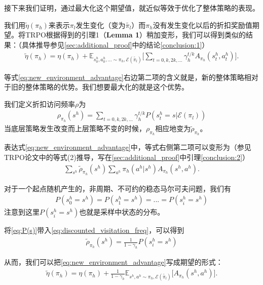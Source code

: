 接下来我们证明，通过最大化这个期望值，就近似等效于优化了整体策略的表现。

我们用$\tilde{\eta}(\pi_h)$来表示$\pi_l$发生变化（变为$\tilde{\pi_l}$）而$\pi_h$没有发生变化以后的折扣奖励值期望。将TRPO根据\cite{TRPO_pre}得到的引理1（\textbf{Lemma 1}）稍加变形，我们可以得到类似的结果：（具体推导参见\ref{sec:additional_proof}中的结论\ref{conclusion:1}）
\begin{align}
  \tilde{\eta}(\pi_h) = \eta(\pi_h) + \mathbb{E}_{s_0^h, a_0^h, ... \sim \pi_h, \mathcal{E}(\tilde{\pi_l})}\Bigg[\sum_{t=0,k,2k,...} \gamma_h^{t/k} A_{\pi_h}(s_t^h, a_t^h)\Bigg].
  \label{eq:new_environment_advantage}
\end{align}

等式\eqref{eq:new_environment_advantage}右边第二项的含义就是，新的整体策略相对于旧的整体策略的优势。我们想要最大化的就是这个优势。

我们定义折扣访问频率$\rho$为
\begin{align}
  \rho_{\pi_h}(s^h) = \sum_{t = 0, k, 2k, ...}\gamma_h^{t/k}P(s_t^h = s|\mathcal{E}(\pi_l))
  \label{eq:discounted_visitation_freq}
\end{align}
当底层策略发生改变而上层策略不变的时候，$\rho_{\pi_h}$相应地变为$\tilde{\rho}_{\pi_h}$。

表达式\eqref{eq:new_environment_advantage}中，等式右侧第二项可以变形为（参见TRPO论文中的等式(2)推导，写在\ref{sec:additional_proof}中引理\ref{conclusion:2}）
\begin{align}
  \sum_{s^h}\tilde{\rho}_{\pi_h}(s^h)\sum_{a^h}\pi_h(a^h|s^h)A_{\pi_h}(s^h,a^h).
  \label{eq:accurate_objective}
\end{align}

对于一个起点随机产生的，非周期、不可约的稳态马尔可夫问题，我们有
\begin{align}
  P(s_0^h = s^h) = P(s_1^h = s^h) = ... = P(s_i^h = s^h)
  \label{eq:P(s)}
\end{align}
注意到这里$P(s_i^h = s^h)$也就是采样中状态的分布。

将\eqref{eq:P(s)}带入\eqref{eq:discounted_visitation_freq}，可以得到
\begin{align}
  \tilde{\rho}_{\pi_h}(s^h) = \frac{1}{1-\gamma_h}P(s_i^h = s^h)
  \label{eq:rho_constant}
\end{align}

从而，我们可以把\eqref{eq:new_environment_advantage}写成期望的形式：
\begin{align}
  \tilde{\eta}(\pi_h) = \eta(\pi_h) + \frac{1}{1-\gamma_h}\mathbb{E}_{s^h, a^h \sim \pi_h, \mathcal{E}(\tilde{\pi_l})}\bigg[A_{\pi_h}(s^h, a^h)\bigg].
  \label{eq:accurate_objective_expectation_form}
\end{align}

